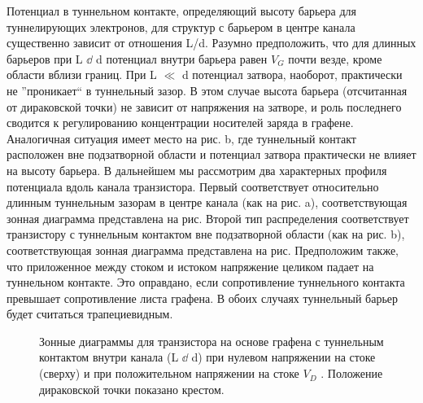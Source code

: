 \documentclass[a4paper,12pt]{article} %
\begin{document}
\noindent Потенциал в туннельном контакте, определяющий высоту барьера для туннелирующих электронов, для структур с барьером в центре канала существенно зависит от отношения L/d. Разумно предположить, что для длинных барьеров при L $\dd$ d потенциал внутри барьера равен $V_G$ почти везде, кроме области вблизи границ. При L $\ll$ d потенциал затвора, наоборот, практически не ”проникает“ в туннельный зазор. В этом случае высота барьера (отсчитанная от дираковской точки) не зависит от напряжения на затворе, и роль последнего сводится к регулированию концентрации носителей заряда в графене. Аналогичная ситуация имеет место на рис. b, где туннельный контакт расположен вне подзатворной области и потенциал затвора практически не влияет на высоту барьера. В дальнейшем мы рассмотрим два характерных профиля потенциала вдоль канала транзистора. Первый соответствует относительно длинным туннельным зазорам в центре канала (как на рис. a), соответствующая зонная диаграмма представлена на рис. Второй тип распределения соответствует транзистору с туннельным контактом вне подзатворной области (как на рис. b), соответствующая зонная диаграмма представлена на рис. Предположим также, что приложенное между стоком и истоком напряжение целиком падает на туннельном контакте. Это оправдано, если сопротивление туннельного контакта превышает сопротивление листа графена. В обоих случаях туннельный барьер будет считаться трапециевидным.
\begin{figure}[h!]
\caption{ Зонные диаграммы для транзистора на основе графена с туннельным контактом внутри канала (L $\dd$ d) при нулевом напряжении на стоке (сверху) и при положительном напряжении на стоке $V_D$ . Положение дираковской точки показано крестом.}
\end{figure}
\end{document}
